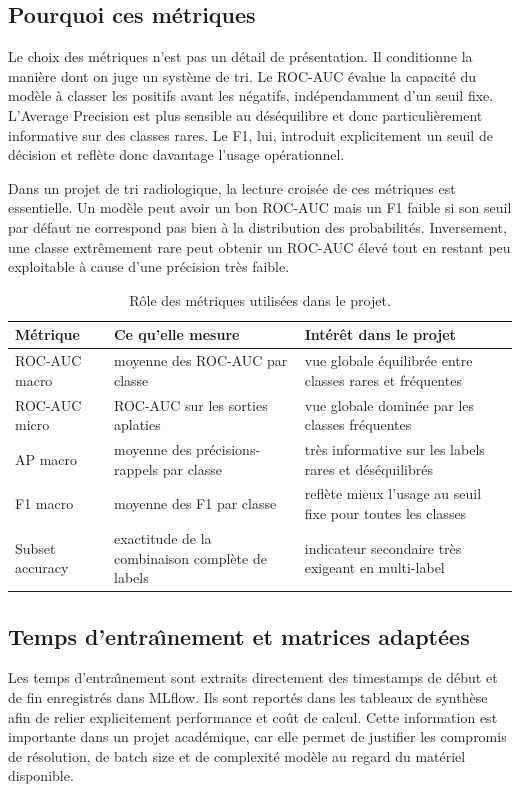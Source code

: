 \documentclass[11pt,a4paper]{article}
\begin{document}
\subsection{Pourquoi ces m\'etriques}
Le choix des m\'etriques n'est pas un d\'etail de pr\'esentation. Il conditionne la mani\`ere dont on juge un syst\`eme de tri. Le ROC-AUC \'evalue la capacit\'e du mod\`ele \`a classer les positifs avant les n\'egatifs, ind\'ependamment d'un seuil fixe. L'Average Precision est plus sensible au d\'es\'equilibre et donc particuli\`erement informative sur des classes rares. Le F1, lui, introduit explicitement un seuil de d\'ecision et refl\`ete donc davantage l'usage op\'erationnel.

Dans un projet de tri radiologique, la lecture crois\'ee de ces m\'etriques est essentielle. Un mod\`ele peut avoir un bon ROC-AUC mais un F1 faible si son seuil par d\'efaut ne correspond pas bien \`a la distribution des probabilit\'es. Inversement, une classe extr\^emement rare peut obtenir un ROC-AUC \'elev\'e tout en restant peu exploitable \`a cause d'une pr\'ecision tr\`es faible.

\begin{table}[H]
    \centering
    \caption{R\^ole des m\'etriques utilis\'ees dans le projet.}
    \small
    \begin{tabular}{p{2.6cm}p{4.2cm}p{6.0cm}}
        \toprule
        M\'etrique & Ce qu'elle mesure & Int\'er\^et dans le projet \\
        \midrule
        ROC-AUC macro & moyenne des ROC-AUC par classe & vue globale \'equilibr\'ee entre classes rares et fr\'equentes \\
        ROC-AUC micro & ROC-AUC sur les sorties aplaties & vue globale domin\'ee par les classes fr\'equentes \\
        AP macro & moyenne des pr\'ecisions-rappels par classe & tr\`es informative sur les labels rares et d\'es\'equilibr\'es \\
        F1 macro & moyenne des F1 par classe & refl\`ete mieux l'usage au seuil fixe pour toutes les classes \\
        Subset accuracy & exactitude de la combinaison compl\`ete de labels & indicateur secondaire tr\`es exigeant en multi-label \\
        \bottomrule
    \end{tabular}
\end{table}

\subsection{Temps d'entra\^\i nement et matrices adapt\'ees}
Les temps d'entra\^\i nement sont extraits directement des timestamps de d\'ebut et de fin enregistr\'es dans MLflow. Ils sont report\'es dans les tableaux de synth\`ese afin de relier explicitement performance et co\^ut de calcul. Cette information est importante dans un projet acad\'emique, car elle permet de justifier les compromis de r\'esolution, de batch size et de complexit\'e mod\`ele au regard du mat\'eriel disponible.
\end{document}
